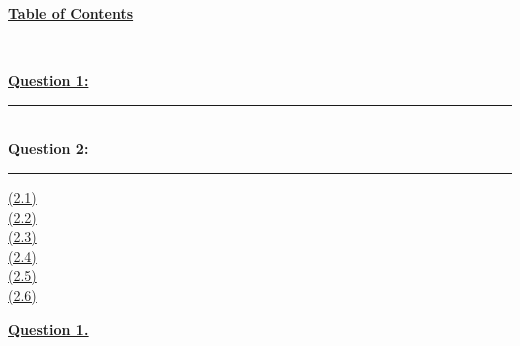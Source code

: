 \documentclass[12pt]{article}
\begin{document}
\begin{center}
	\hypertarget{toc}{\LARGE \underline{\textbf{Table of Contents}}}\\
\end{center}

\hyperlink{1}{\textbf{Question 1:}}
\vspace{1mm}
\hrule
~\\

{\textbf{Question 2:}}
\vspace{1mm}
\hrule
\vspace{1mm}
\hyperlink{2.1}{(2.1)}\\
\hyperlink{2.2}{(2.2)}\\
\hyperlink{2.3}{(2.3)}\\
\hyperlink{2.4}{(2.4)}\\
\hyperlink{2.5}{(2.5)}\\
\hyperlink{2.6}{(2.6)}

\newpage

\hyperlink{toc}{\hypertarget{1}{\LARGE \underline{\textbf{Question 1.}}}}\\
\end{document}

